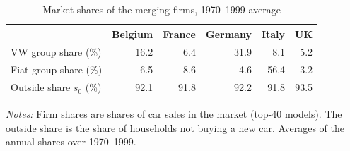 \begin{table}[!htbp]
\centering
\caption{Market shares of the merging firms, 1970--1999 average}
\label{tab:market_structure}
\small
\setlength{\tabcolsep}{5pt}
\renewcommand{\arraystretch}{0.95}

\begin{tabular}{lrrrrr}
\toprule
& Belgium & France & Germany & Italy & UK \\
\midrule
VW group share (\%)          & 16.2 & 6.4 & 31.9 & 8.1 & 5.2 \\
Fiat group share (\%)        & 6.5 & 8.6 & 4.6 & 56.4 & 3.2 \\
Outside share $s_0$ (\%)     & 92.1 & 91.8 & 92.2 & 91.8 & 93.5 \\
\bottomrule
\end{tabular}

\vspace{2pt}
\begin{minipage}{0.85\textwidth}
\footnotesize
\emph{Notes:} Firm shares are shares of car sales in the market (top-40 models).
The outside share is the share of households not buying a new car.
Averages of the annual shares over 1970--1999.
\end{minipage}
\end{table}
